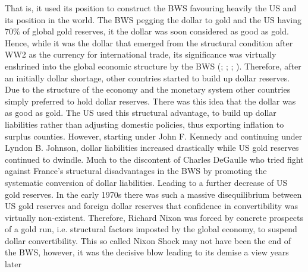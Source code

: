 \documentclass[11pt]{article}
\begin{document}
That is, it used its position to construct the BWS favouring heavily the US and its position in the world. The BWS pegging the dollar to gold and the US having $70 \%$ of global gold reserves, it the dollar was soon considered as good as gold. Hence, while it was the dollar that emerged from the structural condition after WW2 as the currency for international trade, its significance was virtually enshrined into the global economic structure by the BWS (\cite{KlimiukZbigniew2016TPaO, bordo2014tales, kindleberger1986world}; \cite[p.~107]{CohenBenjaminJ2004Tfom}; \cite[p.~229-230]{BeaudMichel1983Ahoc};  \cite[p.~34]{1993Arot}).
Therefore, after an initially dollar shortage, other countries started to build up dollar reserves. Due to the structure of the economy and the monetary system other countries simply preferred to hold dollar reserves. There was this idea that the dollar was as good as gold.
The US used this structural advantage, to build up dollar liabilities rather than adjusting domestic policies, thus exporting inflation to surplus counties. However, starting under John F. Kennedy and continuing under Lyndon B. Johnson, dollar liabilities increased drastically while US gold reserves continued to dwindle. Much to the discontent of Charles DeGaulle who tried fight against France's structural disadvantages in the BWS by promoting the systematic conversion of dollar liabilities. Leading to a further decrease of US gold reserves. 
In the early 1970s there was such a massive disequilibrium between US gold reserves and foreign dollar reserves that confidence in convertibility was virtually non-existent. Therefore, Richard Nixon was forced by concrete prospects of a gold run, i.e. structural factors imposted by the global economy, to suspend dollar convertibility. This so called Nixon Shock may not have been the end of the BWS, however, it was the decisive blow leading to its demise a view years later 
\end{document}
